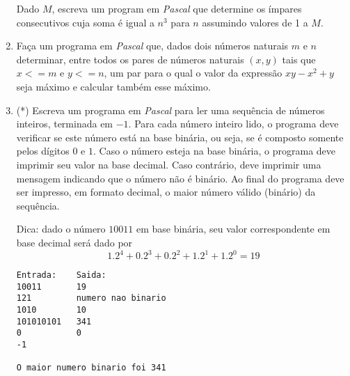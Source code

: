 \begin{enumerate}
Dado $M$, escreva um program em \emph{Pascal} que determine os ímpares
consecutivos cuja soma é igual a $n^3$ para $n$ assumindo valores de
1 a $M$.

\item Faça um programa em {\em  \emph{Pascal}} que, dados
dois números naturais  $m$ e $n$  determinar,  entre todos  os pares de
números naturais $(x,y)$ tais que $x<=m$ e $y<=n$, um  par para o qual
o valor da expressão $xy - x^2 + y$ seja máximo e calcular também esse
máximo.

\item (*) Escreva um programa em \emph{Pascal} para ler uma sequência de
números inteiros, terminada em $-1$. Para cada número inteiro lido, o programa
deve verificar se este número está na base binária, ou seja, se é composto
somente
pelos dígitos $0$ e $1$. Caso o número esteja na base binária, o programa deve
imprimir seu valor na base decimal. Caso contrário, deve imprimir uma
mensagem indicando que o número não é binário. Ao final do programa deve ser
impresso, em formato decimal, o maior número válido (binário) da sequência.

\vspace*{0.25cm}

\noindent Dica: dado o número $10011$ em base binária, seu valor correspondente
em base decimal será dado por
\begin{equation*}
1.2^4 + 0.2^3 + 0.2^2 + 1.2^1 + 1.2^0 = 19 
\end{equation*}


\vspace*{0.25cm}

\begin{verbatim}
Entrada:    Saida:
10011       19
121         numero nao binario
1010        10
101010101   341
0           0
-1

O maior numero binario foi 341
\end{verbatim}




\end{enumerate}

